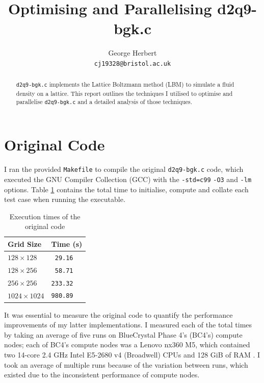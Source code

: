\documentclass[twocolumn, a4paper]{article}
\author{
    George Herbert\\
    \texttt{cj19328@bristol.ac.uk}
}
\title{\vspace{-2em}Optimising and Parallelising d2q9-bgk.c}
\begin{document}
\maketitle

\begin{abstract}
    \texttt{d2q9-bgk.c} implements the Lattice Boltzmann method (LBM) to simulate a fluid density on a lattice.
    This report outlines the techniques I utilised to optimise and parallelise \texttt{d2q9-bgk.c} and a detailed analysis of those techniques.
\end{abstract}

\section{Original Code}

I ran the provided \texttt{Makefile} to compile the original \texttt{d2q9-bgk.c} code, which executed the GNU Compiler Collection (GCC) with the \texttt{-std=c99} \texttt{-O3} and \texttt{-lm} options.
Table \ref{tab:original} contains the total time to initialise, compute and collate each test case when running the executable.

\begin{table}[htbp]
    \begin{center}
    \caption{Execution times of the original code}\label{tab:original}
    \begin{tabular}{l | l} 
        \hline\hline
        Grid Size&Time (s)\\
        \hline
        $128 \times 128$&\texttt{ 29.16}\\
        $128 \times 256$&\texttt{ 58.71}\\
        $256 \times 256$&\texttt{233.32}\\
        $1024 \times 1024$&\texttt{980.89}\\
        \hline
      \end{tabular}
    \end{center}
\end{table} 

It was essential to measure the original code to quantify the performance improvements of my latter implementations.
I measured each of the total times by taking an average of five runs on BlueCrystal Phase 4's (BC4's) compute nodes; each of BC4's compute nodes was a Lenovo nx360 M5, which contained two 14-core 2.4 GHz Intel E5-2680 v4 (Broadwell) CPUs and 128 GiB of RAM \cite{bcp4}.
I took an average of multiple runs because of the variation between runs, which existed due to the inconsistent performance of compute nodes.
\end{document}
